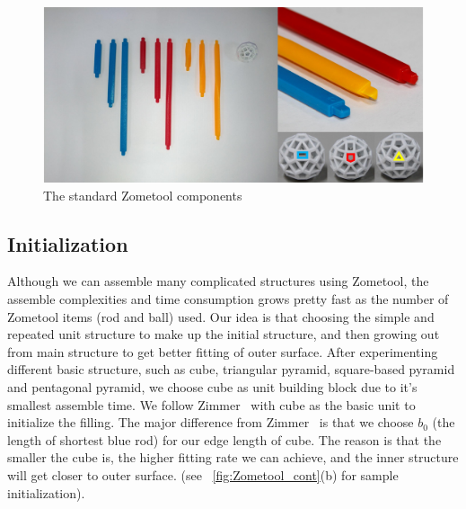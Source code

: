 \begin{figure}[ht]
\centering
\includegraphics[width=1.0\linewidth]{figs/Zometool.pdf} 
\caption{
The standard Zometool components}
\label{fig:Zometool}
\end{figure}

\subsection{Initialization}
Although we can assemble many complicated structures using Zometool, the assemble complexities and time consumption grows pretty fast as the number of Zometool items (rod and ball) used.
Our idea is that choosing the simple and repeated unit structure to make up the initial structure, and then growing out from main structure to get better fitting of outer surface. 
After experimenting different basic structure, such as cube, triangular pyramid, square-based pyramid and pentagonal pyramid, we choose cube as unit building block due to it's smallest assemble time.
We follow Zimmer~\cite{zimmer:2014:Zometool} with cube as the basic unit to initialize the filling. 
The major difference from Zimmer~\cite{zimmer:2014:Zometool} is that we choose $b_0$ (the length of shortest blue rod) for our edge length of cube. 
The reason is that the smaller the cube is, the higher fitting rate we can achieve, and the inner structure will get closer to outer surface.
(see \figname~\ref{fig:Zometool_cont}(b) for sample initialization). 

